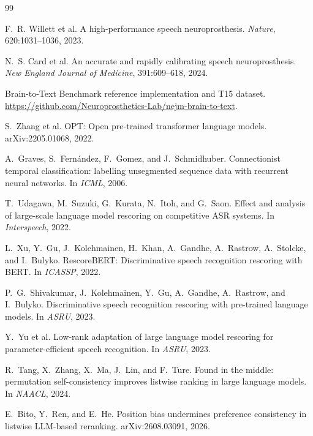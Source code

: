 \documentclass[11pt]{article}
\begin{document}
\begin{thebibliography}{99}\small

F.~R. Willett et al.
\newblock A high-performance speech neuroprosthesis.
\newblock \emph{Nature}, 620:1031--1036, 2023.

N.~S. Card et al.
\newblock An accurate and rapidly calibrating speech neuroprosthesis.
\newblock \emph{New England Journal of Medicine}, 391:609--618, 2024.

Brain-to-Text Benchmark reference implementation and T15 dataset.
\newblock \url{https://github.com/Neuroprosthetics-Lab/nejm-brain-to-text}.

S.~Zhang et al.
\newblock OPT: Open pre-trained transformer language models.
\newblock arXiv:2205.01068, 2022.

A.~Graves, S.~Fern\'andez, F.~Gomez, and J.~Schmidhuber.
\newblock Connectionist temporal classification: labelling unsegmented sequence data with
  recurrent neural networks.
\newblock In \emph{ICML}, 2006.

T.~Udagawa, M.~Suzuki, G.~Kurata, N.~Itoh, and G.~Saon.
\newblock Effect and analysis of large-scale language model rescoring on competitive ASR
  systems.
\newblock In \emph{Interspeech}, 2022.

L.~Xu, Y.~Gu, J.~Kolehmainen, H.~Khan, A.~Gandhe, A.~Rastrow, A.~Stolcke, and I.~Bulyko.
\newblock RescoreBERT: Discriminative speech recognition rescoring with BERT.
\newblock In \emph{ICASSP}, 2022.

P.~G.~Shivakumar, J.~Kolehmainen, Y.~Gu, A.~Gandhe, A.~Rastrow, and I.~Bulyko.
\newblock Discriminative speech recognition rescoring with pre-trained language
  models.
\newblock In \emph{ASRU}, 2023.

Y.~Yu et al.
\newblock Low-rank adaptation of large language model rescoring for
  parameter-efficient speech recognition.
\newblock In \emph{ASRU}, 2023.

R.~Tang, X.~Zhang, X.~Ma, J.~Lin, and F.~Ture.
\newblock Found in the middle: permutation self-consistency improves listwise ranking in
  large language models.
\newblock In \emph{NAACL}, 2024.

E.~Bito, Y.~Ren, and E.~He.
\newblock Position bias undermines preference consistency in listwise LLM-based reranking.
\newblock arXiv:2608.03091, 2026.


\end{thebibliography}
\end{document}
